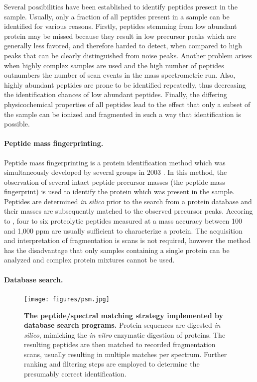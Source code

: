 Several possibilities have been established to identify peptides present
in the sample. 
Usually, only a fraction of all peptides present in a sample can be 
identified for various reasons.
Firstly, peptides stemming from low abundant protein may be missed because 
they result in low precursor peaks which are generally less favored, and
therefore harded to detect, when compared to high peaks that can be clearly
distinguished from noise peaks.
Another problem arises when highly complex samples are used and the
high number of peptides outnumbers the number of scan events in the
mass spectrometric run.
Also, highly abundant peptides are prone to be identified repeatedly,
thus decreasing the identification chances of low abundant peptides.
Finally, the differing physicochemical properties of all peptides
lead to the effect that only a subset of the sample can be ionized and
fragmented in such a way that identification is possible.

\paragraph{Peptide mass fingerprinting.}

Peptide mass fingerprinting is a protein identification method which was
simultaneously developed by several groups in 2003 
\citep{Henzel1993,James1993,Mann1993,Pappin1993a,Yates1993}.
In this method, the observation of several intact peptide precursor masses
(the peptide mass fingerprint) is used to identify the protein which was 
present in the sample.
Peptides are determined {\em in silico} prior to the search from a protein
database and their masses are subsequently matched to the observed precursor
peaks.
Accoring to \citet{Mann1993}, four to six proteolytic peptides measured
at a mass accuracy between 100 and 1,000 ppm are usually sufficient to
characterize a protein.
The acquisition and interpretation of fragmentation is scans is not required, 
however the method has the disadvantage that only samples containing a single 
protein can be analyzed and complex protein mixtures cannot be used.

\paragraph{Database search.}

\begin{figure}
\texttt{[image: figures/psm.jpg]}
\caption{
{\bf The peptide/spectral matching strategy implemented by database search 
programs.} 
Protein sequences are digested {\em in silico}, mimicking the {\em in vitro}
enzymatic digestion of proteins. 
The resulting peptides are then matched to recorded fragmentation scans,
usually resulting in multiple matches per spectrum.
Further ranking and filtering steps are employed to determine the presumably
correct identification.
}
\label{fig:psm}
\end{figure}

